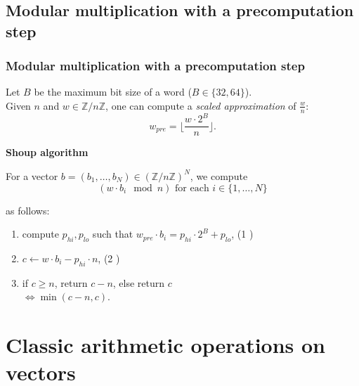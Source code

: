 \documentclass[10pt]{beamer}
\begin{document}
\subsection{Modular multiplication with a precomputation step}
\begin{frame}
    \frametitle{Modular multiplication with a precomputation step}

    \begin{mybox}
        Let $B$ be the maximum bit size of a word ($B\in \{32, 64\}$). \\
        Given $n$ and $w \in \mathbb{Z}/n\mathbb{Z}$, one can compute a \textit{scaled approximation} 
        of $\frac{w}{n}$: $$ w_{pre} = \biggl\lfloor\dfrac{w\cdot 2^{B}}{n} \biggr\rfloor.$$
    \end{mybox}

    \pause
    \bigskip
    \textbf{Shoup algorithm}\cite{Bos_Stam_2021}

    \medskip
    For a vector $b = (b_1,\dots, b_N) \in (\mathbb{Z}/n\mathbb{Z})^N$, we compute 
    $$(w\cdot b_i \mod n) \text{ for each } i\in \{1, \dots, N\}$$

    as follows: 
    \medskip
    \begin{enumerate}
        \item compute $p_{hi}, p_{lo}$ such that $w_{pre} \cdot b_i = p_{hi}\cdot 2^B + p_{lo}$, \hfill (1 )
        \item $c \gets w\cdot b_i - p_{hi}\cdot n$, \hfill (2 )
        \item if $c \geq n$, return $c-n$, else return $c$ \\
            $\Longleftrightarrow \min(c-n, c)$.
    \end{enumerate}
\end{frame}

\section{Classic arithmetic operations on vectors}
\end{document}

